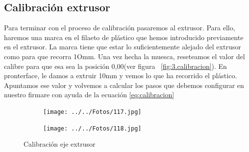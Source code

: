		\subsection{Calibración extrusor}
		Para terminar con el proceso de calibración pasaremos al extrusor. Para ello, haremos una marca en el filaeto de plástico que hemos introducido previamente en el extrusor. La marca tiene que estar lo suficientemente alejado del extrusor como para que recorra 1Omm. Una vez hecha la muesca, reseteamos el valor del calibre para que esa sea la posición 0,00(ver figura ~\ref{fig:3.calibracion}). En pronterface, le damos a extruir 10mm y vemos lo que ha recorrido el plástico. Apuntamos ese valor y volvemos a calcular los pasos que debemos configurar en nuestro firmare con ayuda de la ecuación \ref{eq:calibracion} 
		\begin{figure}[H]
		        \centering
		        \begin{subfigure}[htb]{0.4\textwidth}
		                \centering
		                \texttt{[image: ../../Fotos/117.jpg]}
		                
		        \end{subfigure}
		        \begin{subfigure}[htb]{0.4\textwidth}
		                \centering
		                \texttt{[image: ../../Fotos/118.jpg]}
		                
		        \end{subfigure}
		        \caption{Calibración eje extrusor}\label{fig:5.calibracion}
		\end{figure}